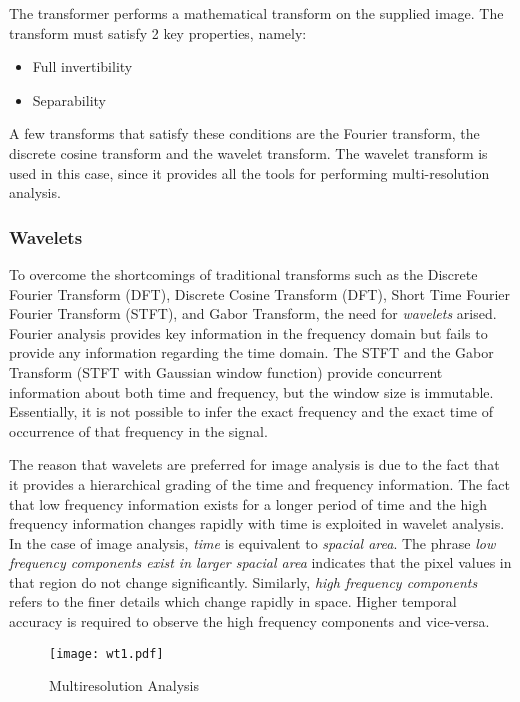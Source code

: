 \documentclass[./A14_Report.tex]{subfiles}
\begin{document}
The transformer performs a mathematical transform on the supplied image. The
transform must satisfy 2 key properties, namely:
\begin{itemize}
    \item Full invertibility
    \item Separability
\end{itemize}

A few transforms that satisfy these conditions are the Fourier transform, the
discrete cosine transform and the wavelet transform. The wavelet transform is
used in this case, since it provides all the tools for performing
multi-resolution analysis.

\subsubsection{Wavelets}%
\label{sec:theory_of_wavelets}

To overcome the shortcomings of traditional transforms such as the Discrete
Fourier Transform (DFT), Discrete Cosine Transform (DFT), Short Time Fourier
Fourier Transform (STFT), and Gabor Transform, the need for \textit{wavelets}
arised. Fourier analysis provides key information in the frequency domain but
fails to provide any information regarding the time domain. The STFT and the
Gabor Transform (STFT with Gaussian window function) provide concurrent
information about both time and frequency, but the window size is immutable.
Essentially, it is not possible to infer the exact frequency and the exact time
of occurrence of that frequency in the signal.

\par

The reason that wavelets are preferred for image analysis is due to the fact
that it provides a hierarchical grading of the time and frequency information.
The fact that low frequency information exists for a longer period of time and
the high frequency information changes rapidly with time is exploited in
wavelet analysis. In the case of image analysis, \textit{time} is equivalent to
\textit{spacial area}. The phrase \textit{low frequency components exist in
larger spacial area} indicates that the pixel values in that region do not
change significantly. Similarly, \textit{high frequency components} refers to
the finer details which change rapidly in space.  Higher temporal accuracy is
required to observe the high frequency components and vice-versa.

\FloatBarrier
\begin{figure}[htpb]
    \centering
    \texttt{[image: wt1.pdf]}
    \caption{Multiresolution Analysis}%
    \label{fig:multiresolution}
\end{figure}
\FloatBarrier
\end{document}
